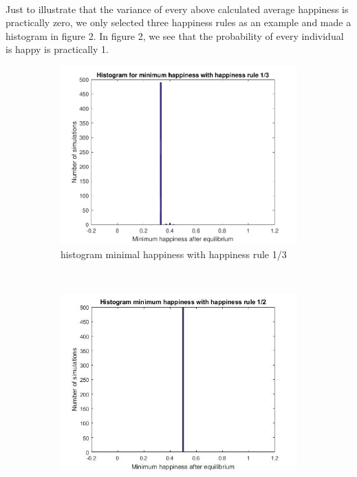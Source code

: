 \documentclass{article}
\begin{document}
\\
Just to illustrate that the variance of every above calculated average happiness is practically zero, we only selected three happiness rules as an example and made a histogram in figure 2. In figure 2, we see that the probability of every individual is happy is practically 1.
\newpage
\begin{figure}[ht]
    \centering
    \begin{subfigure}[t]{0.32\textwidth}
        \includegraphics[width=\textwidth]{histogram_min_happiness_een_derde}
        \caption{histogram minimal happiness with happiness rule 1/3}
        \label{fig:gull}
    \end{subfigure}
    ~ %
    \begin{subfigure}[t]{0.32\textwidth}
        \includegraphics[width=\textwidth]{histogram_min_happiness_half}

\end{subfigure}
\end{figure}
\end{document}
